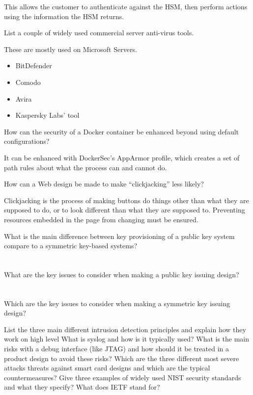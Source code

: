 \begin{questions}
\begin{solution}
    This allows the customer to authenticate against the HSM, then perform actions using the information the HSM returns.
  \end{solution}

\question{} List a couple of widely used commercial server anti-virus tools.
  \begin{solution}
    These are mostly used on Microsoft Servers.
    \begin{itemize}[noitemsep]
    \item BitDefender
    \item Comodo
    \item Avira
    \item Kaspersky Labs' tool
    \end{itemize}
  \end{solution}

\question{} How can the security of a Docker container be enhanced beyond using default configurations?
  \begin{solution}
    It can be enhanced with DockerSec's AppArmor profile, which creates a set of path rules about what the process can and cannot do.
  \end{solution}

\question{} How can a Web design be made to make ``clickjacking'' less likely?
  \begin{solution}
    Clickjacking is the process of making buttons do things other than what they are supposed to do, or to look different than what they are supposed to.
    Preventing resources embedded in the page from changing must be ensured.
  \end{solution}

\question{} What is the main difference between key provisioning of a public key system compare to a symmetric key-based systems?
  \begin{parts}
  \part{} What are the key issues to consider when making a public key issuing design?
  \part{} Which are the key issues to consider when making a symmetric key issuing design?
  \end{parts}

\question{} List the three main different intrusion detection principles and explain how they work on high level
\question{} What is syslog and how is it typically used?
\question{} What is the main risks with a debug interface (like JTAG) and how should it be treated in a product design to avoid these risks?
\question{} Which are the three different most severe attacks threats against smart card designs and which are the typical countermeasures?
\question{} Give three examples of widely used NIST security standards and what they specify?
\question{} What does IETF stand for?
  \begin{parts}

\end{parts}
\end{questions}
